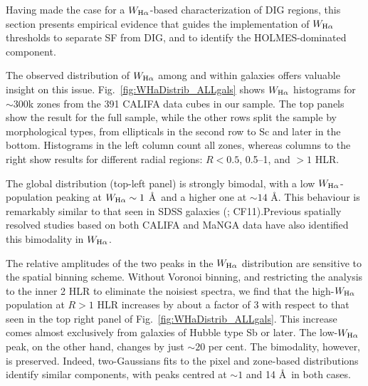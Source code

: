 \documentclass[a4paper, fleqn, usenatbib, useAMS]{mnras}
\newcommand{\Ha}{\ifmmode {\rm H}\alpha \else H$\alpha$\fi\xspace}
\begin{document}
Having made the case for a $W_{\Ha}$-based characterization of DIG regions, this section presents empirical evidence that guides the implementation of $W_{\Ha}$ thresholds to separate SF from DIG, and to identify the HOLMES-dominated component.

The observed distribution of $W_{\Ha}$ among and within galaxies offers valuable insight on this issue. Fig.\ \ref{fig:WHaDistrib_ALLgals} shows $W_{\Ha}$ histograms for $\sim 300$k zones from the 391 CALIFA data cubes in our sample. The top panels show the result for the full sample, while the other rows split the sample by morphological types, from ellipticals in the second row to Sc and later in the bottom. Histograms in the left column count all zones, whereas columns to the right show results for different radial regions: $R < 0.5$, 0.5--1, and $> 1$ HLR.

The global distribution (top-left panel) is strongly bimodal, with a low $W_{\Ha}$-population peaking at $W_{\Ha} \sim 1$ \AA\ and a higher one at $\sim 14$ \AA. This behaviour is remarkably similar to that seen in SDSS galaxies (\citealt{Bamford.etal.2008a}; CF11).Previous spatially resolved studies based on both CALIFA \citep{Morisset.etal.2016} and MaNGA data \citep{Belfiore.etal.2016, Belfiore.etal.2017} have also identified this bimodality in $W_{\Ha}$.

The relative amplitudes of the two peaks in the $W_{\Ha}$ distribution are sensitive to the spatial binning scheme. Without Voronoi binning, and restricting the analysis to the inner 2 HLR to eliminate the noisiest spectra, we find that the high-$W_{\Ha}$ population at $R > 1$ HLR increases by about a factor of 3 with respect to that seen in the top right panel of Fig.\ \ref{fig:WHaDistrib_ALLgals}. This increase comes almost exclusively from galaxies of Hubble type Sb or later. The low-$W_{\Ha}$ peak, on the other hand, changes by just  $\sim 20$ per cent. The bimodality, however, is preserved. Indeed, two-Gaussians fits to the pixel and zone-based distributions identify similar components, with peaks centred at $\sim 1$ and 14 \AA\ in both cases.
\end{document}
